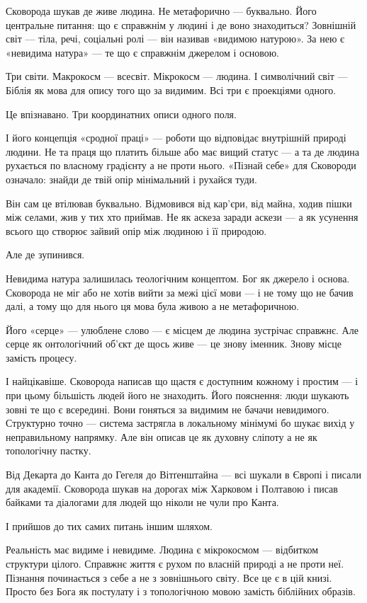 \documentclass[12pt, a4paper, openany]{book}
\begin{document}
Сковорода шукав де живе людина. Не метафорично --- буквально. Його центральне питання: що є справжнім у людині і де воно знаходиться? Зовнішній світ --- тіла, речі, соціальні ролі --- він називав «видимою натурою». За нею є «невидима натура» --- те що є справжнім джерелом і основою.

Три світи. Макрокосм --- всесвіт. Мікрокосм --- людина. І символічний світ --- Біблія як мова для опису того що за видимим. Всі три є проекціями одного.

Це впізнавано. Три координатних описи одного поля.

І його концепція «сродної праці» --- роботи що відповідає внутрішній природі людини. Не та праця що платить більше або має вищий статус --- а та де людина рухається по власному градієнту а не проти нього. «Пізнай себе» для Сковороди означало: знайди де твій опір мінімальний і рухайся туди.

Він сам це втілював буквально. Відмовився від кар'єри, від майна, ходив пішки між селами, жив у тих хто приймав. Не як аскеза заради аскези --- а як усунення всього що створює зайвий опір між людиною і її природою.

Але де зупинився.

Невидима натура залишилась теологічним концептом. Бог як джерело і основа. Сковорода не міг або не хотів вийти за межі цієї мови --- і не тому що не бачив далі, а тому що для нього ця мова була живою а не метафоричною.

Його «серце» --- улюблене слово --- є місцем де людина зустрічає справжнє. Але серце як онтологічний об'єкт де щось живе --- це знову іменник. Знову місце замість процесу.

І найцікавіше. Сковорода написав що щастя є доступним кожному і простим --- і при цьому більшість людей його не знаходить. Його пояснення: люди шукають зовні те що є всередині. Вони гоняться за видимим не бачачи невидимого. Структурно точно --- система застрягла в локальному мінімумі бо шукає вихід у неправильному напрямку. Але він описав це як духовну сліпоту а не як топологічну пастку.

Від Декарта до Канта до Гегеля до Вітґенштайна --- всі шукали в Європі і писали для академії. Сковорода шукав на дорогах між Харковом і Полтавою і писав байками та діалогами для людей що ніколи не чули про Канта.

І прийшов до тих самих питань іншим шляхом.

Реальність має видиме і невидиме. Людина є мікрокосмом --- відбитком структури цілого. Справжнє життя є рухом по власній природі а не проти неї. Пізнання починається з себе а не з зовнішнього світу. Все це є в цій книзі. Просто без Бога як постулату і з топологічною мовою замість біблійних образів.
\end{document}
